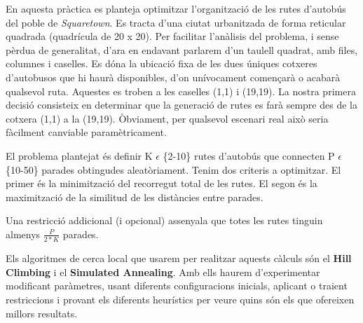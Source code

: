 En aquesta pràctica es planteja optimitzar l'organització de les rutes d'autobús del poble de \emph{Squaretown}. Es tracta d'una ciutat urbanitzada de forma reticular quadrada (quadrícula de 20 x 20). Per facilitar l'anàlisis del problema, i sense pèrdua de generalitat, d'ara en endavant parlarem d'un taulell quadrat, amb files, columnes i caselles. Es dóna la ubicació fixa de les dues úniques cotxeres d'autobusos que hi haurà disponibles, d'on unívocament començarà o acabarà qualsevol ruta. Aquestes es troben a les caselles (1,1) i (19,19). La nostra primera decisió consisteix en determinar que la generació de rutes es farà sempre des de la cotxera (1,1) a la (19,19). Òbviament, per qualsevol escenari real això seria fàcilment canviable paramètricament.

El problema plantejat és definir K $\epsilon$ \{2-10\} rutes d'autobús que connecten P $\epsilon$ \{10-50\} parades obtingudes aleatòriament. Tenim dos criteris a optimitzar. El primer és la minimització del recorregut total de les rutes. El segon és la maximització de la similitud de les distàncies entre parades.

Una restricció addicional (i opcional) assenyala que totes les rutes tinguin almenys $\frac{P}{2*K}$ parades.

Els algoritmes de cerca local que usarem per realitzar aquests càlculs són el \textbf{Hill Climbing} i el \textbf{Simulated Annealing}. Amb ells haurem d'experimentar modificant paràmetres, usant diferents configuracions inicials, aplicant o traient restriccions i provant els diferents heurístics per veure quins són els que ofereixen millors resultats.


% 
% 
% 
% 
% 
% 
% 

% 
% 

